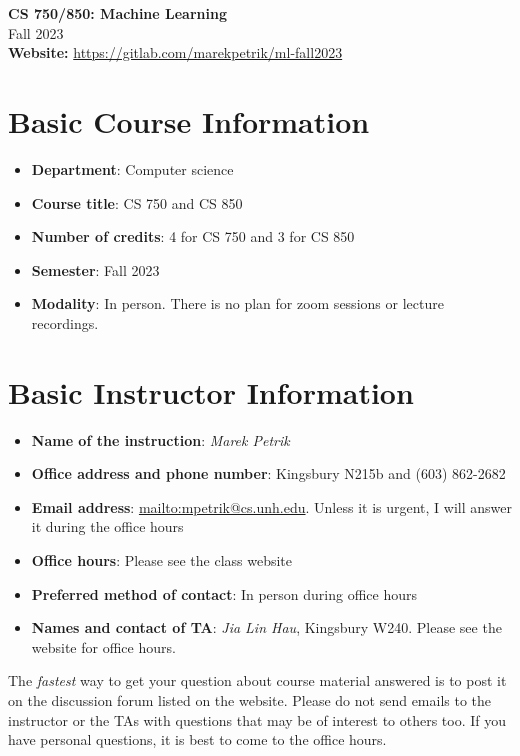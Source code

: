 \documentclass[11pt]{article}
\date{}
\begin{document}
\begin{center}
	{\Large\bf CS 750/850: Machine Learning}\\
	Fall 2023\\
	\textbf{Website:} \url{https://gitlab.com/marekpetrik/ml-fall2023}
\end{center}


\section{Basic Course Information}

\begin{itemize}
\item \textbf{Department}: Computer science
\item \textbf{Course title}: CS 750 and CS 850
\item \textbf{Number of credits}: 4 for CS 750 and 3 for CS 850
\item \textbf{Semester}: Fall 2023
\item \textbf{Modality}: In person. There is no plan for zoom sessions or lecture recordings.
\end{itemize}

\section{Basic Instructor Information}

\begin{itemize}
\item \textbf{Name of the instruction}: \emph{Marek Petrik}
\item \textbf{Office address and phone number}: Kingsbury N215b and  (603) 862-2682
\item \textbf{Email address}: \url{mailto:mpetrik@cs.unh.edu}. Unless it is urgent, I will answer it during the office hours
\item \textbf{Office hours}: Please see the class website
\item \textbf{Preferred method of contact}: In person during office hours
\item \textbf{Names and contact of TA}: \emph{Jia Lin Hau}, Kingsbury W240. Please see the website for office hours.
\end{itemize}

The \emph{fastest} way to get your question about course material answered is to post it on the discussion forum listed on the website. Please do not send emails to the instructor or the TAs with questions that may be of interest to others too. If you have personal questions, it is best to come to the office hours.
\end{document}

